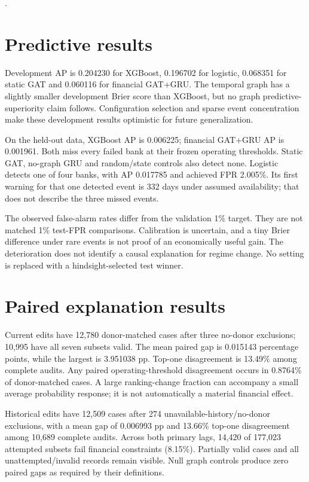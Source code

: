 \documentclass[11pt]{article}
\begin{document}
\citep{gnnexplainer2019,rfidelity2024}.
\section{Predictive results}
Development AP is 0.204230 for XGBoost, 0.196702 for logistic, 0.068351 for static GAT and 0.060116 for financial GAT+GRU. The temporal graph has a slightly smaller development Brier score than XGBoost, but no graph predictive-superiority claim follows. Configuration selection and sparse event concentration make these development results optimistic for future generalization.

On the held-out data, XGBoost AP is 0.006225; financial GAT+GRU AP is 0.001961. Both miss every failed bank at their frozen operating thresholds. Static GAT, no-graph GRU and random/state controls also detect none. Logistic detects one of four banks, with AP 0.017785 and achieved FPR 2.005\%. Its first warning for that one detected event is 332 days under assumed availability; that does not describe the three missed events.

The observed false-alarm rates differ from the validation 1\% target. They are not matched 1\% test-FPR comparisons. Calibration is uncertain, and a tiny Brier difference under rare events is not proof of an economically useful gain. The deterioration does not identify a causal explanation for regime change. No setting is replaced with a hindsight-selected test winner.

\section{Paired explanation results}
Current edits have 12,780 donor-matched cases after three no-donor exclusions; 10,995 have all seven subsets valid. The mean paired gap is 0.015143 percentage points, while the largest is 3.951038 pp. Top-one disagreement is 13.49\% among complete audits. Any paired operating-threshold disagreement occurs in 0.8764\% of donor-matched cases. A large ranking-change fraction can accompany a small average probability response; it is not automatically a material financial effect.

Historical edits have 12,509 cases after 274 unavailable-history/no-donor exclusions, with a mean gap of 0.006993 pp and 13.66\% top-one disagreement among 10,689 complete audits. Across both primary lags, 14,420 of 177,023 attempted subsets fail financial constraints (8.15\%). Partially valid cases and all unattempted/invalid records remain visible. Null graph controls produce zero paired gaps as required by their definitions.
\end{document}

